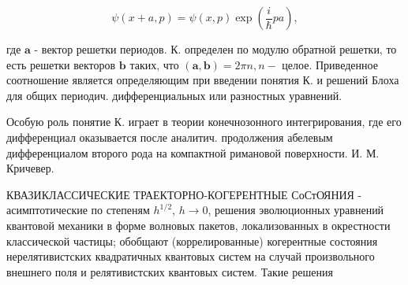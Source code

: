 \documentclass[10pt]{article}
\begin{document}
\[

\psi(x+a, p)=\psi(x, p) \exp \left(\frac{i}{\hbar} p a\right),

\]



где $\boldsymbol{a}$ - вектор решетки периодов. К. определен по модулю обратной решетки, то есть решетки векторов $\boldsymbol{b}$ таких, что $(\boldsymbol{a}, \boldsymbol{b})=2 \pi n, n-$ целое. Приведенное соотношение является определяющим при введении понятия К. и решений Блоха для общих периодич. дифференциальных или разностных уравнений.



Особую роль понятие К. играет в теории конечнозонного интегрирования, где его дифференциал оказывается после аналитич. продолжения абелевым дифференциалом второго рода на компактной римановой поверхности. И. М. Кричевер.



КВАЗИКЛАССИЧЕСКИЕ ТРАЕКТОРНО-КОГЕРЕНТНЫЕ СоСтОЯНИЯ - асимптотические по степеням $h^{1 / 2}$, $h \rightarrow 0$, решения эволюционных уравнений квантовой механики в форме волновых пакетов, локализованных в окрестности классической частицы; обобщают (коррелированные) когерентные состояния нерелятивистских квадратичных квантовых систем на случай произвольного внешнего поля и релятивистских квантовых систем. Такие решения
\end{document}
